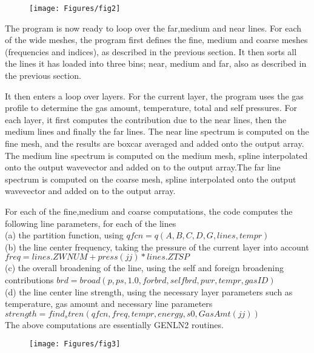 \documentclass[11pt]{article}
\begin{document}
\begin{figure}
  \begin{center}\texttt{[image: Figures/fig2]}\end{center}
  \caption[Outline of initialization algorithm]{}
  \label{fig:init_alg}
\end{figure}

The program is now ready to loop over the far,medium and near lines. 
For each of the wide meshes, the program first defines the fine, medium and
coarse meshes (frequencies and indices), as described in the previous 
section. It then sorts all the lines it has loaded into three bins; near,
medium and far, also as described in the previous section.

It then enters a loop over layers. For the current layer, the program uses 
the gas profile to determine the gas amount, temperature, total and self 
pressures. For each layer, it first computes the contribution due to the 
near lines, then the medium lines and finally the far lines. The near line 
spectrum is computed
on the fine mesh, and the results are boxcar averaged and added onto the
output array. The medium line spectrum is computed on the medium mesh, 
spline interpolated onto the output wavevector and added on to the output 
array.The far line spectrum is computed on the coarse mesh, spline 
interpolated onto the output wavevector and added on to the output array.

For each of the fine,medium and coarse computations, the code computes
the following line parameters, for each of the lines\\
(a) the partition function, using $qfcn=q(A,B,C,D,G,lines,tempr)$\\
(b) the line center frequency, taking the pressure of the current layer into
    account $freq=lines.ZWNUM+press(jj)*lines.ZTSP$\\
(c) the overall broadening of the line, using the self and foreign 
    broadening
    contributions $brd=broad(p,ps,1.0,forbrd,selfbrd,pwr,tempr,gasID)$\\
(d) the line center line strength, using the necessary layer parameters 
    such as temperature, gas amount and necessary line parameters \\
    $strength=find_stren(qfcn,freq,tempr,energy,s0,GasAmt(jj))$\\
The above computations are essentially GENLN2 routines.

\begin{figure}
  \begin{center}\texttt{[image: Figures/fig3]}\end{center}
  \caption[Outline of loops over layers and fine,medium,coarse meshes]{}
  \label{fig:loop_alg}
\end{figure}
\end{document}
